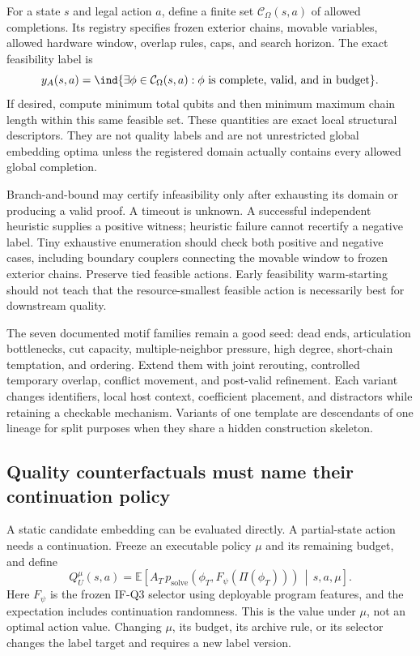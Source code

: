 For a state $s$ and legal action $a$, define a finite set $\mathcal C_\Omega(s,a)$ of allowed completions. Its registry specifies frozen exterior chains, movable variables, allowed hardware window, overlap rules, caps, and search horizon. The exact feasibility label is
\[
 y_A(s,a)=\ind\{\exists\phi\in\mathcal C_\Omega(s,a):
                    \phi\text{ is complete, valid, and in budget}\}.
\]
If desired, compute minimum total qubits and then minimum maximum chain length within this same feasible set. These quantities are exact local structural descriptors. They are not quality labels and are not unrestricted global embedding optima unless the registered domain actually contains every allowed global completion.

Branch-and-bound may certify infeasibility only after exhausting its domain or producing a valid proof. A timeout is unknown. A successful independent heuristic supplies a positive witness; heuristic failure cannot recertify a negative label. Tiny exhaustive enumeration should check both positive and negative cases, including boundary couplers connecting the movable window to frozen exterior chains. Preserve tied feasible actions. Early feasibility warm-starting should not teach that the resource-smallest feasible action is necessarily best for downstream quality.

The seven documented motif families remain a good seed: dead ends, articulation bottlenecks, cut capacity, multiple-neighbor pressure, high degree, short-chain temptation, and ordering. Extend them with joint rerouting, controlled temporary overlap, conflict movement, and post-valid refinement. Each variant changes identifiers, local host context, coefficient placement, and distractors while retaining a checkable mechanism. Variants of one template are descendants of one lineage for split purposes when they share a hidden construction skeleton.

\subsection{Quality counterfactuals must name their continuation policy}
\label{data:counterfactual}

A static candidate embedding can be evaluated directly. A partial-state action needs a continuation. Freeze an executable policy $\mu$ and its remaining budget, and define
\begin{equation}
 Q_U^\mu(s,a)=\mathbb E\!\left[
      A_T\,p_{\mathrm{solve}}\!\left(
      \phi_T,F_\psi(\Pi(\phi_T))\right)
      \,\middle|\,s,a,\mu\right].
 \label{data:qmu}
\end{equation}
Here $F_\psi$ is the frozen IF-Q3 selector using deployable program features, and the expectation includes continuation randomness. This is the value under $\mu$, not an optimal action value. Changing $\mu$, its budget, its archive rule, or its selector changes the label target and requires a new label version.

